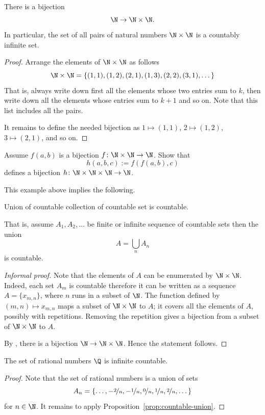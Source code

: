 \documentclass[12pt]{book}
\begin{document}
\begin{example}\label{example:NxN}
There is a bijection
$$\N\to \N\times \N.$$
In particular, the set of all pairs of natural numbers $\N\times \N$ is a countably infinite set.

\begin{proof}
Arrange the elements of $\N \times \N$ as follows
$$\N \times \N= \{(1,1), (1,2), (2,1), (1,3), (2,2), (3,1),\dots\}$$
That is, always write down first all the elements whose two entries sum to $k$, then write down all the elements whose entries sum to $k+1$ and so on.
Note that this list includes all the pairs.

It remains to define the needed bijection as $1\mapsto(1,1)$, $2\mapsto(1,2)$, $3\mapsto(2,1)$, and so on.
\end{proof}
\end{example}%

\begin{exercise}
Assume $f(a,b)$ is a bijection $f\colon\N\times \N\to \N$. 
Show that 
$$h(a,b,c):=f(f(a,b),c)$$ 
defines a bijection $h\colon\N\times\N\times\N\to \N$.
\end{exercise}

This example above implies the following.

\begin{prop}\label{prop:countable-union}
Union of countable collection of countable set is countable.

That is, assume $A_1,A_2,\dots$ be finite or infinite sequence of countable sets then the union
$$A=\bigcup_n A_n$$
is countable.
\end{prop}

\begin{proof}[Informal proof]
Note that the elements of $A$ can be enumerated by $\N\times \N$.
Indeed, each set $A_m$ is countable therefore it can be written as a sequence $A=\{x_{m,n}\}$, where $n$ runs in a subset of $\N$.
The function 
defined by $(m,n)\mapsto x_{m,n}$ maps a subset of $\N\times \N$ to $A$;
it covers all the elements of $A$, possibly with repetitions.
Removing the repetition gives a bijection from a subset of $\N\times \N$ to $A$.

By , there is a bijection $\N\to \N\times\N$.
Hence the statement follows.
\end{proof}

\begin{example}\label{Q-countable}
The set of rational numbers $\Q$ is infinite countable.

\begin{proof}
Note that the set of rational numbers is a union of sets 
$$A_n=\{\dots,-\nicefrac2n,-\nicefrac1n,\nicefrac0n,\nicefrac1n,\nicefrac2n,\dots\}$$
for $n\in \N$.
It remains to apply Proposition~\ref{prop:countable-union}.
\end{proof}
\end{example}
\end{document}
